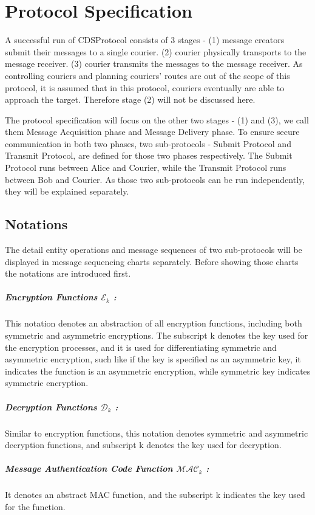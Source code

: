 \chapter{Protocol Specification}
A successful run of CDSProtocol consists of 3 stages - (1) message creators submit their messages to a single courier. (2) courier physically transports to the message receiver. (3) courier transmits the messages to the message receiver. As controlling couriers and  planning couriers' routes are out of the scope of this protocol, it is assumed that in this protocol, couriers eventually are able to approach the target. Therefore stage (2) will not be discussed here. \par
The protocol specification will focus on the other two stages - (1) and (3), we call them Message Acquisition phase and Message Delivery phase. To ensure secure communication in both two phases, two sub-protocols - Submit Protocol and Transmit Protocol, are defined for those two phases respectively. The Submit Protocol runs between Alice and Courier, while the Transmit Protocol runs between Bob and Courier. As those two sub-protocols can be run independently, they will be explained separately.
\section{Notations}
The detail entity operations and message sequences of two sub-protocols will be displayed in message sequencing charts separately. Before showing those charts the notations are introduced first.
\paragraph{Encryption Functions $\mathcal{E}_k$ :}
This notation denotes an abstraction of all encryption functions, including both symmetric and asymmetric encryptions. The subscript k denotes the key used for the encryption processes, and it is used for differentiating symmetric and asymmetric encryption, such like if the key is specified as an asymmetric key, it indicates the function is an asymmetric encryption, while symmetric key indicates symmetric encryption.
\paragraph{Decryption Functions $\mathcal{D}_k$ :}
Similar to encryption functions, this notation denotes symmetric and asymmetric decryption functions, and subscript k denotes the key used for decryption.
\paragraph{Message Authentication Code Function $\mathcal{MAC}_k$ :}
It denotes an abstract MAC function, and the subscript k indicates the key used for the function.
